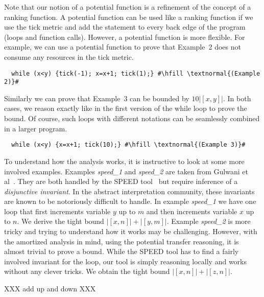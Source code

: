 \documentclass[nocopyrightspace,preprint]{sigplanconf}
\begin{document}
Note that our notion of a potential function is a refinement of the
concept of a ranking function.  A potential function can be used like
a ranking function if we use the tick metric and add the statement
 to every back edge of the program (loops and function
calls).  However, a potential function is more flexible.  For example,
we can use a potential function to prove that Example~2 does not
consume any resources in the tick metric.
\begin{lstlisting}
  while (x<y) {tick(-1); x=x+1; tick(1);} #\hfill \textnormal{(Example 2)}#
\end{lstlisting}
Similarly we can prove that Example~3 can be bounded by $10|[x,y]|$.
In both cases, we reason exactly like in the first version of the
while loop to prove the bound.  Of course, such loops with different
notations can be seamlessly combined in a larger program.
\begin{lstlisting}
  while (x<y) {x=x+1; tick(10);} #\hfill \textnormal{(Example 3)}#
\end{lstlisting}
%
To understand how the analysis works, it is instructive to look at
some more involved examples.  Examples \emph{speed\_1} and
\emph{speed\_2} are taken from Gulwani et al~\cite{Gulwani-speed}.
They are both handled by the SPEED tool~\cite{Gulwani-speed} but
require inference of a \emph{disjunctive invariant}.  In the abstract
interpretation community, these invariants are known to be notoriously
difficult to handle.
%
In example \emph{speed\_1} we have one loop that first increments
variable $y$ up to $m$ and then increments variable $x$ up to $n$.  We
derive the tight bound $|[x, n]| + |[y, m]|$.
%
Example \emph{speed\_2} is more tricky and trying to understand how it
works may be challenging.  However, with the amortized analysis in
mind, using the potential transfer reasoning, it is almost trivial to
prove a bound.  While the SPEED tool has to find a fairly
involved invariant for the loop, our tool is simply reasoning locally
and works without any clever tricks. We obtain the tight bound $|[x,
n]| + |[z, n]|$.


XXX add up and down XXX


\newlength{\progwidth}
\end{document}
